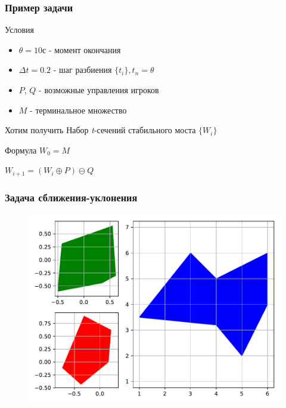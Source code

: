 \documentclass{beamer}
\begin{document}
  
  \begin{frame}
    \frametitle{Пример задачи}

    \begin{block}{Условия}
      \begin{itemize}
        \item $\theta = 10 с$ - момент окончания

        \item $\Delta t = 0.2$ - шаг разбиения $\{t_i\}, t_n = \theta$

        \item $P$, $Q$ - возможные управления игроков

        \item $M$ - терминальное множество

      \end{itemize}
    \end{block}

    \begin{block}{Хотим получить}
      Набор \textit{t}-сечений стабильного моста $\{W_{i}\}$  
    \end{block}

    \begin{block}{Формула}
      $W_0 = M$

      $W_{i+1} = ( W_i \oplus P ) \ominus  Q$
    \end{block}

  \end{frame}

  \begin{frame}
    \frametitle{Задача сближения-уклонения}

    \begin{figure}
        \includegraphics[width=\linewidth,height=0.8\textheight,keepaspectratio]{example1_pqm}
    \end{figure}

  \end{frame}  
\end{document}
